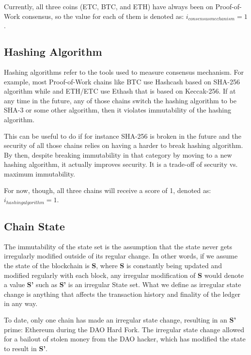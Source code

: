 \documentclass{article}
\begin{document}
Currently, all three coins (ETC, BTC, and ETH) have always been on Proof-of-Work consensus, so the value for each of them is denoted as: $i_{consensusmechanism} = 1$.

\subsection{Hashing Algorithm}

Hashing algorithms refer to the tools used to measure consensus mechanism. For example, most Proof-of-Work chains like BTC use Hashcash\cite{hashcash} based on SHA-256 algorithm while and ETH/ETC use Ethash\cite{ethash} that is based on Keccak-256. If at any time in the future, any of those chains switch the hashing algorithm to be SHA-3 or some other algorithm, then it violates immutability of the hashing algorithm.

This can be useful to do if for instance SHA-256 is broken in the future and the security of all those chains relies on having a harder to break hashing algorithm. By then, despite breaking immutability in that category by moving to a new hashing algorithm, it actually improves security. It is a trade-off of security vs. maximum immutability.

For now, though, all three chains will receive a score of 1, denoted as: $i_{hashingalgorithm} = 1$.

\subsection{Chain State}

The immutability of the state set is the assumption that the state never gets irregularly modified outside of its regular change. In other words, if we assume the state of the blockchain is \textbf{S}, where \textbf{S} is constantly being updated and modified regularly with each block, any irregular modification of \textbf{S} would denote a value \textbf{S'} such as \textbf{S'} is an irregular State set. What we define as irregular state change is anything that affects the transaction history and finality of the ledger in any way.

To date, only one chain has made an irregular state change, resulting in an \textbf{S'} prime: Ethereum during the DAO Hard Fork\cite{daofork}. The irregular state change allowed for a bailout of stolen money from the DAO hacker, which has modified the state to result in \textbf{S'}.
\end{document}
